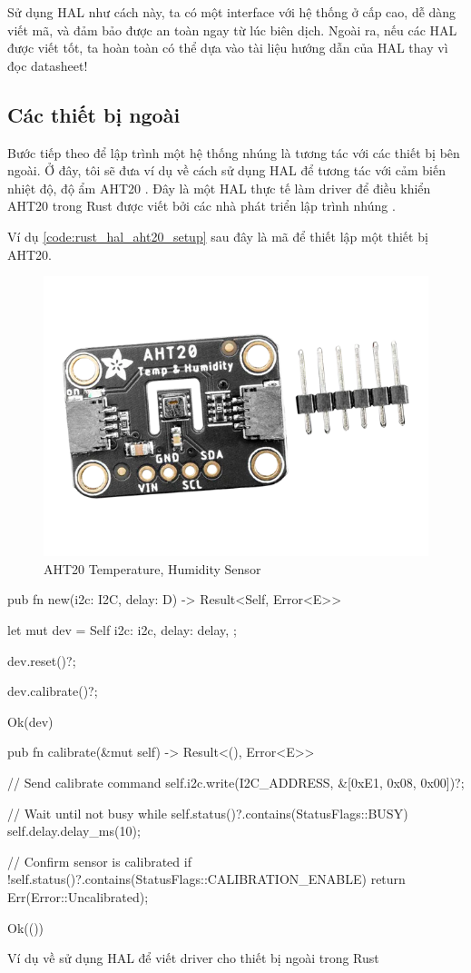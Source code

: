 Sử dụng HAL như cách này, ta có một interface với hệ thống ở cấp cao, dễ dàng viết mã, và đảm bảo được an toàn ngay từ lúc biên dịch.
Ngoài ra, nếu các HAL được viết tốt, ta hoàn toàn có thể dựa vào tài liệu hướng dẫn của HAL thay vì đọc datasheet!

\subsection{Các thiết bị ngoài}
Bước tiếp theo để lập trình một hệ thống nhúng là tương tác với các thiết bị bên ngoài.
Ở đây, tôi sẽ đưa ví dụ về cách sử dụng HAL để tương tác với cảm biến nhiệt độ, độ ẩm AHT20 \cite{aht20_datasheet}.
Đây là một HAL thực tế làm driver để điều khiển AHT20 trong Rust được viết bởi các nhà phát triển lập trình nhúng \cite{hal_aht20}.

Ví dụ \ref{code:rust_hal_aht20_setup} sau đây là mã để thiết lập một thiết bị AHT20.

\begin{figure}[ht]
\centering
\includegraphics[scale=0.5]{images/aht20.png}
\caption{AHT20 Temperature, Humidity Sensor}
\end{figure}

\clearpage
\begin{listing}[ht]
\begin{rustcode}
pub fn new(i2c: I2C, delay: D) -> Result<Self, Error<E>> {
    let mut dev = Self {
        i2c: i2c,
        delay: delay,
    };

    dev.reset()?;

    dev.calibrate()?;

    Ok(dev)
}
pub fn calibrate(&mut self) -> Result<(), Error<E>> {
    // Send calibrate command
    self.i2c.write(I2C_ADDRESS, &[0xE1, 0x08, 0x00])?;

    // Wait until not busy
    while self.status()?.contains(StatusFlags::BUSY) {
        self.delay.delay_ms(10);
    }

    // Confirm sensor is calibrated
    if !self.status()?.contains(StatusFlags::CALIBRATION_ENABLE) {
        return Err(Error::Uncalibrated);
    }

    Ok(())
}
\end{rustcode}
\caption{Ví dụ về sử dụng HAL để viết driver cho thiết bị ngoài trong Rust}
\label{code:rust_hal_aht20_setup}
\end{listing}

